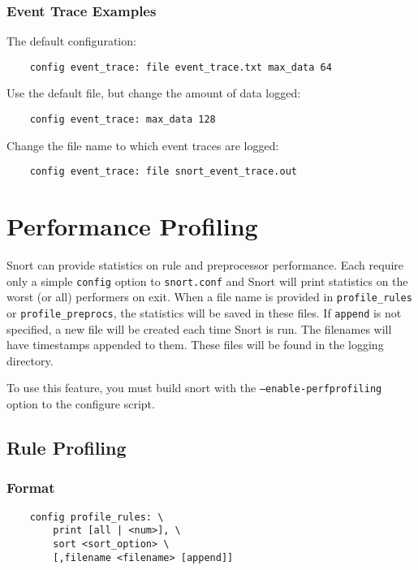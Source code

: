 \documentclass[english]{report}
\begin{document}
\subsubsection{Event Trace Examples}

The default configuration:

\begin{verbatim}
    config event_trace: file event_trace.txt max_data 64
\end{verbatim}

Use the default file, but change the amount of data logged:

\begin{verbatim}
    config event_trace: max_data 128
\end{verbatim}

Change the file name to which event traces are logged:

\begin{verbatim}
    config event_trace: file snort_event_trace.out
\end{verbatim}

\section{Performance Profiling}

Snort can provide statistics on rule and preprocessor performance.  Each
require only a simple \texttt{config} option to \texttt{snort.conf} and Snort
will print statistics on the worst (or all) performers on exit. When a file
name is provided in \texttt{profile\_rules} or \texttt{profile\_preprocs}, the
statistics will be saved in these files.  If \texttt{append} is not specified,
a new file will be created each time Snort is run. The filenames will have
timestamps appended to them.  These files will be found in the logging
directory.

To use this feature, you must build snort with the \texttt{--enable-perfprofiling}
option to the configure script.

\subsection{Rule Profiling}
\label{rule profiling}

\subsubsection{Format}

\begin{verbatim}
    config profile_rules: \
        print [all | <num>], \
        sort <sort_option> \
        [,filename <filename> [append]]
\end{verbatim}
\end{document}
